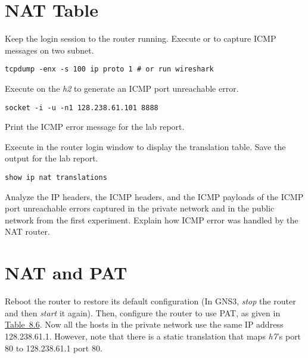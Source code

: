 \documentclass{../UTNetLab}
\begin{document}
\section{NAT Table}
Keep the login session to the router running.
Execute  or  to capture ICMP messages on two subnet.

\begin{lstlisting}
tcpdump -enx -s 100 ip proto 1 # or run wireshark
\end{lstlisting}

Execute  on the \textit{h2} to generate an ICMP port unreachable error.

\begin{lstlisting}
socket -i -u -n1 128.238.61.101 8888
\end{lstlisting}

Print the ICMP error message for the lab report.

Execute  in the router login window to display the translation table.
Save the output for the lab report.

\begin{lstlisting}[frame=trBL]
show ip nat translations
\end{lstlisting}

\begin{report}
    \item Analyze the IP headers, the ICMP headers, and the ICMP payloads of the ICMP port unreachable errors captured in the private network and in the public network from the first experiment.
    Explain how ICMP error was handled by the NAT router.
\end{report}

\section{NAT and PAT}
Reboot the router to restore its default configuration (In GNS3, \textit{stop} the router and then \textit{start} it again).
Then, configure the router to use PAT, as given in \hyperref[tab:8.6]{Table~8.6}.
Now all the hosts in the private network use the same IP address 128.238.61.1.
However, note that there is a static translation that maps \textit{h7}’s port 80 to 128.238.61.1 port 80.
\end{document}

